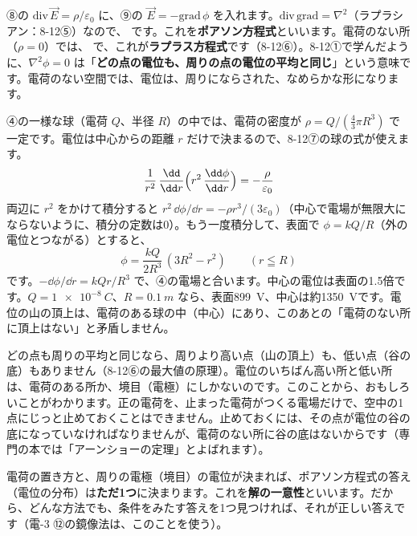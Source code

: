 \label{ph:電-2:sec10}
⑧の $\mathrm{div}\,\vec E=\rho/\varepsilon_0$ に、⑨の $\vec E=-\mathrm{grad}\,\phi$ を入れます。$\mathrm{div}\,\mathrm{grad}=\nabla^2$（ラプラシアン：8-12⑤）なので、
です。これを\textbf{ポアソン方程式}といいます。電荷のない所（$\rho=0$）では、
\label{ph:電-2:laplace}で、これが\textbf{ラプラス方程式}です（8-12⑥）。8-12①で学んだように、$\nabla^2\phi=0$ は「\textbf{どの点の電位も、周りの点の電位の平均と同じ}」という意味です。電荷のない空間では、電位は、周りにならされた、なめらかな形になります。

\begin{motto}[5]
④の一様な球（電荷 $Q$、半径 $R$）の中では、電荷の密度が $\rho=Q/(\tfrac43\pi R^3)$ で一定です。電位は中心からの距離 $r$ だけで決まるので、8-12⑦の球の式が使えます。
\[\frac{1}{r^2}\,\frac{\dd}{\dd r}\Bigl(r^2\,\frac{\dd\phi}{\dd r}\Bigr)=-\frac{\rho}{\varepsilon_0}\]
両辺に $r^2$ をかけて積分すると $r^2\,\dd\phi/\dd r=-\rho r^3/(3\varepsilon_0)$（中心で電場が無限大にならないように、積分の定数は0）。もう一度積分して、表面で $\phi=kQ/R$（外の電位とつながる）とすると、
\[\phi=\frac{kQ}{2R^3}\,(3R^2-r^2)\qquad(r\leqq R)\]
です。$-\dd\phi/\dd r=kQr/R^3$ で、④の電場と合います。中心の電位は表面の1.5倍です。$Q=\qty{1e-8}{C}$、$R=\qty{0.1}{m}$ なら、表面\qty{899}{V}、中心は約\qty{1350}{V}です。電位の山の頂上は、電荷のある球の中（中心）にあり、このあとの「電荷のない所に頂上はない」と矛盾しません。
\end{motto}

どの点も周りの平均と同じなら、周りより高い点（山の頂上）も、低い点（谷の底）もありません（8-12⑥の最大値の原理）。電位のいちばん高い所と低い所は、電荷のある所か、境目（電極）にしかないのです。このことから、おもしろいことがわかります。正の電荷を、止まった電荷がつくる電場だけで、空中の1点にじっと止めておくことはできません。止めておくには、その点が電位の谷の底になっていなければなりませんが、電荷のない所に谷の底はないからです（専門の本では「アーンショーの定理」とよばれます）。


電荷の置き方と、周りの電極（境目）の電位が決まれば、ポアソン方程式の答え（電位の分布）は\textbf{ただ1つ}に決まります。これを\textbf{解の一意性}といいます。だから、どんな方法でも、条件をみたす答えを1つ見つければ、それが正しい答えです（電-3 ⑫の鏡像法は、このことを使う）。

